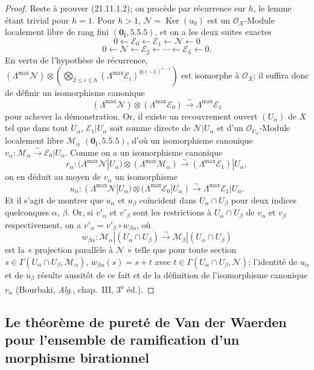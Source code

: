 \begin{proof}
Reste à prouver (21.11.1.2); on procède par récurrence sur $h$, le lemme étant trivial
pour $h=1$. Pour $h>1$, $\mathscr N=\operatorname{Ker}(u_0)$ est un
$\mathcal O_X$-Module localement libre de rang fini $(\mathbf 0_{\mathrm I}, 5.5.5)$,
et on a les deux suites exactes
\[
  0\leftarrow\mathscr E_0\leftarrow\mathscr E_1
  \leftarrow\mathscr N\leftarrow0
\]
\[
  0\leftarrow\mathscr N\leftarrow\mathscr E_2
  \leftarrow\cdots\leftarrow\mathscr E_h\leftarrow0.
\]
En vertu de l'hypothèse de récurrence,
$(\Lambda^{\max}\mathscr N)\otimes
(\bigotimes_{2\leq i\leq h}(\Lambda^{\max}\mathscr E_i)^{\otimes(-1)^{i-1}})$
est isomorphe à $\mathcal O_X$; il suffira donc de définir un isomorphisme canonique
\[
  (\Lambda^{\max}\mathscr N)\otimes(\Lambda^{\max}\mathscr E_0)
  \xrightarrow{\sim}\Lambda^{\max}\mathscr E_1
\]
pour achever la démonstration. Or, il existe un recouvrement ouvert $(U_\alpha)$ de
$X$ tel que dans tout $U_\alpha$, $\mathscr E_1|U_\alpha$ soit somme directe de
$\mathscr N|U_\alpha$ et d'un $\mathcal O_{U_\alpha}$-Module localement libre
$\mathscr M_\alpha$ $(\mathbf 0_{\mathrm I}, 5.5.5)$, d'où un isomorphisme canonique
$v_\alpha:\mathscr M_\alpha\xrightarrow{\sim}\mathscr E_0|U_\alpha$.
Comme on a un isomorphisme canonique
\[
  r_\alpha:(\Lambda^{\max}\mathscr N|U_\alpha)
  \otimes(\Lambda^{\max}\mathscr M_\alpha)
  \xrightarrow{\sim}(\Lambda^{\max}\mathscr E_1)|U_\alpha,
\]
on en déduit au moyen de $v_\alpha$ un isomorphisme
\[
  u_\alpha:(\Lambda^{\max}\mathscr N|U_\alpha)
  \otimes(\Lambda^{\max}\mathscr E_0|U_\alpha)
  \xrightarrow{\sim}\Lambda^{\max}\mathscr E_1|U_\alpha.
\]
Et il s'agit de montrer que $u_\alpha$ et $u_\beta$ coïncident dans
$U_\alpha\cap U_\beta$ pour deux indices quelconques $\alpha$, $\beta$. Or, si
$v'_\alpha$ et $v'_\beta$ sont les restrictions à $U_\alpha\cap U_\beta$ de
$v_\alpha$ et $v_\beta$ respectivement, on a
$v'_\alpha=v'_\beta\circ w_{\beta\alpha}$, où
\[
  w_{\beta\alpha}:\mathscr M_\alpha|(U_\alpha\cap U_\beta)
  \xrightarrow{\sim}\mathscr M_\beta|(U_\alpha\cap U_\beta)
\]
est la « projection parallèle à $\mathscr N$ » telle que pour toute section
$s\in\Gamma(U_\alpha\cap U_\beta,\mathscr M_\alpha)$,
$w_{\beta\alpha}(s)=s+t$ avec
$t\in\Gamma(U_\alpha\cap U_\beta,\mathscr N)$; l'identité de $u_\alpha$ et de
$u_\beta$ résulte aussitôt de ce fait et de la définition de l'isomorphisme canonique
$r_\alpha$ (Bourbaki, \emph{Alg.}, chap.~III, 3\textsuperscript{e} éd.).
\end{proof}

\subsection{Le théorème de pureté de Van der Waerden pour l'ensemble de
ramification d'un morphisme birationnel}
\label{IV.21.12}

